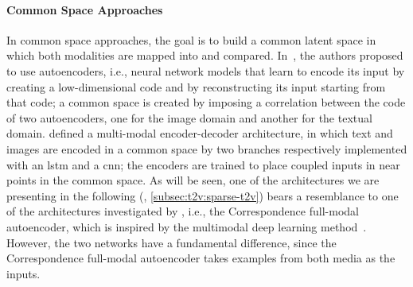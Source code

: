 \paragraph{Common Space Approaches}
In common space approaches, the goal is to build a common latent space in which both modalities are mapped into and compared.
In~\cite{ngiam2011multimodal,feng2014cross}, the authors proposed to use autoencoders, i.e., neural network models that learn to encode its input by creating a low-dimensional code and by reconstructing its input starting from that code;
a common space is created by imposing a correlation between the code of two autoencoders, one for the image domain and another for the textual domain.
\citet{kiros2014unifying} defined a multi-modal encoder-decoder architecture, in which text and images are encoded in a common space by two branches respectively implemented with an \gls{lstm} and a \gls{cnn};
the encoders are trained to place coupled inputs in near points in the common space.
As will be seen, one of the architectures we are presenting in the following (\sparsettv{}, \ref{subsec:t2v:sparse-t2v}) bears a resemblance to one of the architectures investigated by \citet{feng2014cross}, i.e., the Correspondence full-modal autoencoder, which is inspired by the multimodal deep learning method~\cite{ngiam2011multimodal}.
However, the two networks have a fundamental difference, since the Correspondence full-modal autoencoder takes examples from both media as the inputs.
%
